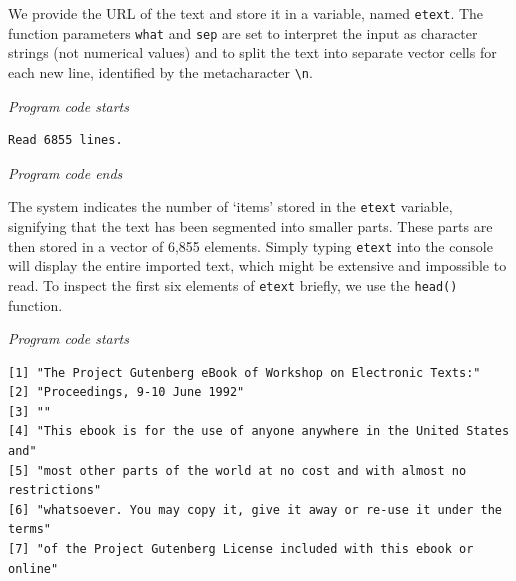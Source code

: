 We provide the URL of the text and store it in a variable, named
\texttt{etext}. The function parameters \texttt{what} and \texttt{sep}
are set to interpret the input as character strings (not numerical
values) and to split the text into separate vector cells for each
new line, identified by the metacharacter \texttt{\textbackslash{}n}.

\emph{Program code starts}

\begin{Shaded}
\begin{Highlighting}[]
\OtherTok{\textless{}{-}} 

\OtherTok{\textless{}{-}}  \NormalTok{, }\NormalTok{)}
\end{Highlighting}
\end{Shaded}

\begin{verbatim}
Read 6855 lines.
\end{verbatim}

\emph{Program code ends}

The system indicates the number of `items' stored in the \texttt{etext}
variable, signifying that the text has been segmented into smaller
parts. These parts are then stored in a vector of 6,855 elements. Simply
typing \texttt{etext} into the console will display the entire imported
text, which might be extensive and impossible to read. To 
inspect the first six elements of \texttt{etext} briefly, we use the
\texttt{head()} function.

\emph{Program code starts}

\begin{Shaded}
\begin{Highlighting}[]
\end{Highlighting}
\end{Shaded}

\begin{verbatim}
[1] "The Project Gutenberg eBook of Workshop on Electronic Texts:"            
[2] "Proceedings, 9-10 June 1992"                                             
[3] ""                                                                        
[4] "This ebook is for the use of anyone anywhere in the United States and"   
[5] "most other parts of the world at no cost and with almost no restrictions"
[6] "whatsoever. You may copy it, give it away or re-use it under the terms"  
[7] "of the Project Gutenberg License included with this ebook or online"     
\end{verbatim}

